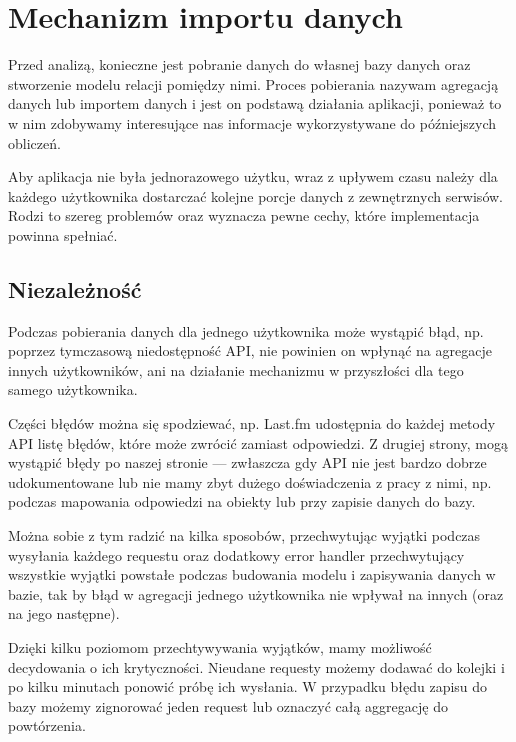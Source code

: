 \documentclass[brudnopis]{xmgr}
\begin{document}
    \section{Mechanizm importu danych}
        Przed analizą, konieczne jest pobranie danych do własnej bazy danych oraz stworzenie modelu relacji pomiędzy nimi.
        Proces pobierania nazywam agregacją danych lub importem danych i jest on podstawą działania aplikacji,
        ponieważ to w nim zdobywamy interesujące nas informacje wykorzystywane do późniejszych obliczeń.

        Aby aplikacja nie była jednorazowego użytku, wraz z upływem czasu należy dla każdego użytkownika dostarczać
        kolejne porcje danych z zewnętrznych serwisów.
        Rodzi to szereg problemów oraz wyznacza pewne cechy, które implementacja powinna spełniać.

        \subsection*{Niezależność}
            Podczas pobierania danych dla jednego użytkownika może wystąpić błąd, np. poprzez tymczasową niedostępność API,
            nie powinien on wpłynąć na agregacje innych użytkowników, ani na działanie mechanizmu w przyszłości dla tego samego użytkownika.

            Części błędów można się spodziewać, np. Last.fm udostępnia do każdej metody API listę błędów, które może zwrócić zamiast odpowiedzi.
            Z drugiej strony, mogą wystąpić błędy po naszej stronie --- zwłaszcza gdy API nie jest bardzo dobrze udokumentowane
            lub nie mamy zbyt dużego doświadczenia z pracy z nimi, np. podczas mapowania odpowiedzi na obiekty lub przy zapisie danych do bazy.

            Można sobie z tym radzić na kilka sposobów, przechwytując wyjątki podczas wysyłania każdego requestu
            oraz dodatkowy error handler przechwytujący wszystkie wyjątki powstałe podczas budowania modelu i zapisywania danych w bazie,
            tak by błąd w agregacji jednego użytkownika nie wpływał na innych (oraz na jego następne).

            Dzięki kilku poziomom przechtywywania wyjątków, mamy możliwość decydowania o ich krytyczności.
            Nieudane requesty możemy dodawać do kolejki i po kilku minutach ponowić próbę ich wysłania.
            W przypadku błędu zapisu do bazy możemy zignorować jeden request lub oznaczyć całą aggregację do powtórzenia.
\end{document}
